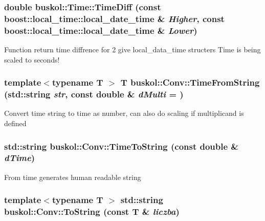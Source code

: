 \hypertarget{group__libbuskol_gac6d1980cc97a5c78f36a3fd96ceaa573}{
\subsubsection[{TimeDiff}]{\setlength{\rightskip}{0pt plus 5cm}double buskol::Time::TimeDiff (const boost::local\_\-time::local\_\-date\_\-time \& {\em Higher}, \/  const boost::local\_\-time::local\_\-date\_\-time \& {\em Lower})}}
\label{group__libbuskol_gac6d1980cc97a5c78f36a3fd96ceaa573}
Function return time diffrence for 2 give local\_\-data\_\-time structers Time is being scaled to seconds! \hypertarget{group__libbuskol_gad76da3426fefe4b30feba7c0e170dccd}{
\subsubsection[{TimeFromString}]{\setlength{\rightskip}{0pt plus 5cm}template$<$typename T $>$ T buskol::Conv::TimeFromString (std::string {\em str}, \/  const double \& {\em dMulti} = {})}}
\label{group__libbuskol_gad76da3426fefe4b30feba7c0e170dccd}
Convert time string to time as number, can also do scaling if multiplicand is defined \hypertarget{group__libbuskol_ga6c72f99eb28381403eb06abee5ea7c44}{
\subsubsection[{TimeToString}]{\setlength{\rightskip}{0pt plus 5cm}std::string buskol::Conv::TimeToString (const double \& {\em dTime})}}
\label{group__libbuskol_ga6c72f99eb28381403eb06abee5ea7c44}
From time generates human readable string \hypertarget{group__libbuskol_ga0b261d6de4c26434d56ba40d00daa68a}{
\subsubsection[{ToString}]{\setlength{\rightskip}{0pt plus 5cm}template$<$typename T $>$ std::string buskol::Conv::ToString (const T \& {\em liczba})}}
